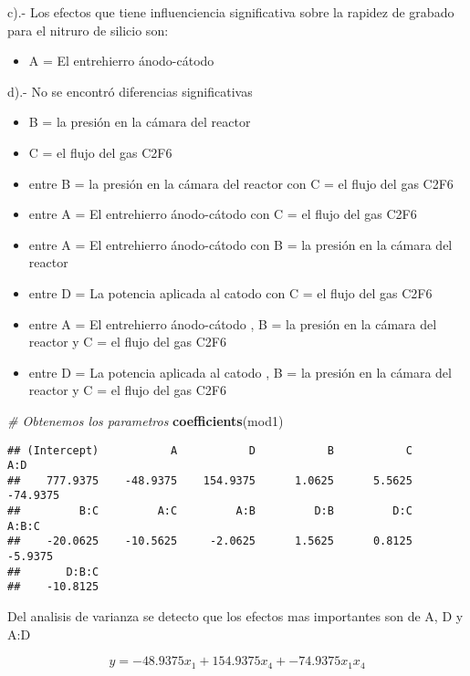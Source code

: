 \documentclass[]{article}
\newenvironment{Shaded}{\begin{snugshade}}{\end{snugshade}}
\newcommand{\CommentTok}[1]{\textcolor[rgb]{0.56,0.35,0.01}{\textit{#1}}}
\newcommand{\KeywordTok}[1]{\textcolor[rgb]{0.13,0.29,0.53}{\textbf{#1}}}
\newcommand{\NormalTok}[1]{#1}
\providecommand{\tightlist}{%
  \setlength{\itemsep}{0pt}\setlength{\parskip}{0pt}}
\begin{document}
c).- Los efectos que tiene influenciencia significativa sobre la rapidez
de grabado para el nitruro de silicio son:

\begin{itemize}
\tightlist
\item
  A = El entrehierro ánodo-cátodo
\end{itemize}

d).- No se encontró diferencias significativas

\begin{itemize}
\item
  B = la presión en la cámara del reactor
\item
  C = el flujo del gas C2F6
\item
  entre B = la presión en la cámara del reactor con C = el flujo del gas
  C2F6
\item
  entre A = El entrehierro ánodo-cátodo con C = el flujo del gas C2F6
\item
  entre A = El entrehierro ánodo-cátodo con B = la presión en la cámara
  del reactor
\item
  entre D = La potencia aplicada al catodo con C = el flujo del gas C2F6
\item
  entre A = El entrehierro ánodo-cátodo , B = la presión en la cámara
  del reactor y C = el flujo del gas C2F6
\item
  entre D = La potencia aplicada al catodo , B = la presión en la cámara
  del reactor y C = el flujo del gas C2F6
\end{itemize}

\begin{Shaded}
\begin{Highlighting}[]
\CommentTok{# Obtenemos los parametros}
\KeywordTok{coefficients}\NormalTok{(mod1)}
\end{Highlighting}
\end{Shaded}

\begin{verbatim}
## (Intercept)           A           D           B           C         A:D 
##    777.9375    -48.9375    154.9375      1.0625      5.5625    -74.9375 
##         B:C         A:C         A:B         D:B         D:C       A:B:C 
##    -20.0625    -10.5625     -2.0625      1.5625      0.8125     -5.9375 
##       D:B:C 
##    -10.8125
\end{verbatim}

Del analisis de varianza se detecto que los efectos mas importantes son
de A, D y A:D

\[ y =  -48.9375x_1 + 154.9375x_4 + -74.9375x_1x_4 \]
\end{document}
